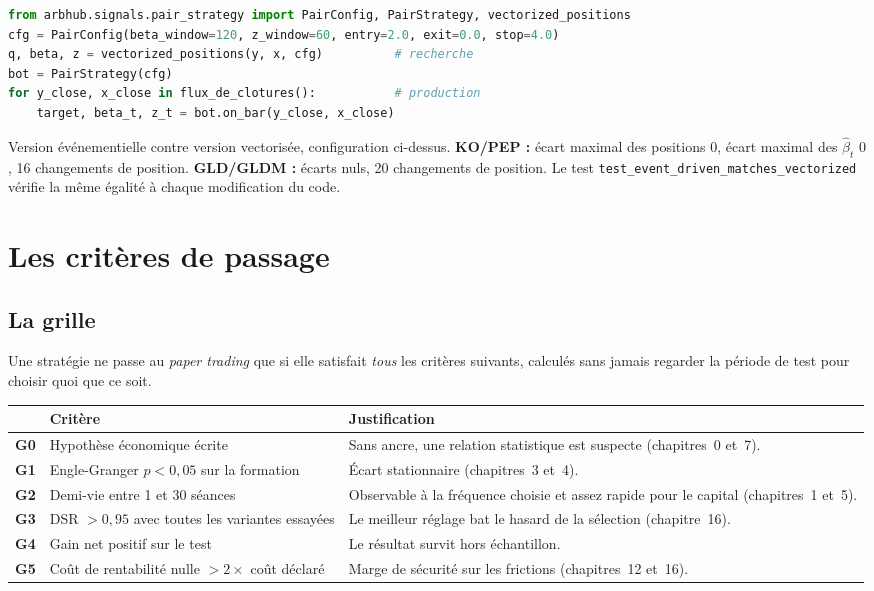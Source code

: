 \begin{lstlisting}[language=Python]
from arbhub.signals.pair_strategy import PairConfig, PairStrategy, vectorized_positions
cfg = PairConfig(beta_window=120, z_window=60, entry=2.0, exit=0.0, stop=4.0)
q, beta, z = vectorized_positions(y, x, cfg)          # recherche
bot = PairStrategy(cfg)
for y_close, x_close in flux_de_clotures():           # production
    target, beta_t, z_t = bot.on_bar(y_close, x_close)
\end{lstlisting}

\begin{codebox}
Version événementielle contre version vectorisée, configuration ci-dessus. \textbf{KO/PEP :} écart maximal des positions $0$, écart maximal des $\hat\beta_t$ $0$, 16 changements de position. \textbf{GLD/GLDM :} écarts nuls, 20 changements de position. Le test \texttt{test\_event\_driven\_matches\_vectorized} vérifie la même égalité à chaque modification du code.
\end{codebox}

\section{Les critères de passage}

\subsection{La grille}

Une stratégie ne passe au \emph{paper trading} que si elle satisfait \emph{tous} les critères suivants, calculés sans jamais regarder la période de test pour choisir quoi que ce soit.

\begin{center}\small
\begin{tabularx}{\textwidth}{>{\bfseries}p{0.7cm}>{\raggedright}p{4.6cm}>{\raggedright\arraybackslash}X}
\toprule
\normalfont & Critère & Justification \\
\midrule
G0 & Hypothèse économique écrite & Sans ancre, une relation statistique est suspecte (chapitres~0 et~7). \\
G1 & Engle-Granger $p<0{,}05$ sur la formation & Écart stationnaire (chapitres~3 et~4). \\
G2 & Demi-vie entre 1 et 30 séances & Observable à la fréquence choisie et assez rapide pour le capital (chapitres~1 et~5). \\
G3 & DSR $>0{,}95$ avec toutes les variantes essayées & Le meilleur réglage bat le hasard de la sélection (chapitre~16). \\
G4 & Gain net positif sur le test & Le résultat survit hors échantillon. \\
G5 & Coût de rentabilité nulle $> 2\times$ coût déclaré & Marge de sécurité sur les frictions (chapitres~12 et~16). \\
\bottomrule
\end{tabularx}
\end{center}

